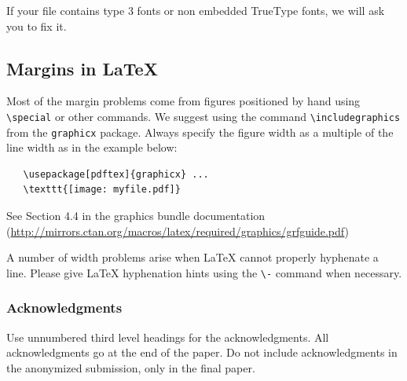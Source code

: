 \documentclass{article}
\begin{document}
If your file contains type 3 fonts or non embedded TrueType fonts, we will ask
you to fix it.

\subsection{Margins in \LaTeX{}}

Most of the margin problems come from figures positioned by hand using
\verb+\special+ or other commands. We suggest using the command
\verb+\includegraphics+ from the \verb+graphicx+ package. Always specify the
figure width as a multiple of the line width as in the example below:
\begin{verbatim}
   \usepackage[pdftex]{graphicx} ...
   \texttt{[image: myfile.pdf]}
\end{verbatim}
See Section 4.4 in the graphics bundle documentation
(\url{http://mirrors.ctan.org/macros/latex/required/graphics/grfguide.pdf})

A number of width problems arise when \LaTeX{} cannot properly hyphenate a
line. Please give LaTeX hyphenation hints using the \verb+\-+ command when
necessary.

\subsubsection*{Acknowledgments}

Use unnumbered third level headings for the acknowledgments. All acknowledgments
go at the end of the paper. Do not include acknowledgments in the anonymized
submission, only in the final paper.




\end{document}
